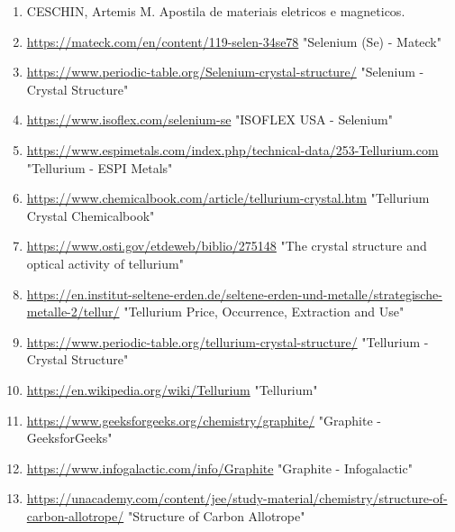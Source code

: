 \documentclass[10pt,twocolumn,letterpaper]{article}
\begin{document}
\small
\begin{enumerate}
    \item CESCHIN, Artemis M. Apostila de materiais eletricos e magneticos.
    
    \item \url{https://mateck.com/en/content/119-selen-34se78} "Selenium (Se) - Mateck"
    
    \item \url{https://www.periodic-table.org/Selenium-crystal-structure/} "Selenium - Crystal Structure"
    
    \item \url{https://www.isoflex.com/selenium-se} "ISOFLEX USA - Selenium"
    
    \item \url{https://www.espimetals.com/index.php/technical-data/253-Tellurium.com} "Tellurium - ESPI Metals"
    
    \item \url{https://www.chemicalbook.com/article/tellurium-crystal.htm} "Tellurium Crystal Chemicalbook"
    
    \item \url{https://www.osti.gov/etdeweb/biblio/275148} "The crystal structure and optical activity of tellurium"
    
    \item \url{https://en.institut-seltene-erden.de/seltene-erden-und-metalle/strategische-metalle-2/tellur/} "Tellurium Price, Occurrence, Extraction and Use"
    
    \item \url{https://www.periodic-table.org/tellurium-crystal-structure/} "Tellurium - Crystal Structure"
    
    \item \url{https://en.wikipedia.org/wiki/Tellurium} "Tellurium"
    
    \item \url{https://www.geeksforgeeks.org/chemistry/graphite/} "Graphite - GeeksforGeeks"
    
    \item \url{https://www.infogalactic.com/info/Graphite} "Graphite - Infogalactic"
    
    \item \url{https://unacademy.com/content/jee/study-material/chemistry/structure-of-carbon-allotrope/} "Structure of Carbon Allotrope"
\end{enumerate}
\end{document}
